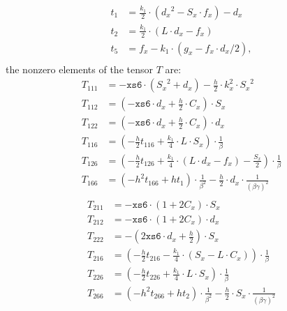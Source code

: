 \documentclass{cern-art} %
\begin{document}
\[
\begin{array}{rl}
     t_1 &= {\frac{k_1}{2}} {\cdot} \left({d_x}^2 - {S_x}{\cdot}{f_x}\right) - {d_x}\\
     t_2 &= {\frac{k_1}{2}} {\cdot} \left(L{\cdot}{d_x} - {f_x}\right)\\
     t_5 &= {f_x} - {k_1} {\cdot} \left({g_x} - {f_x}{\cdot}{d_x} / 2\right),\\
\end{array}
\]
the nonzero elements of the tensor $T$ are:
\[
\begin{array}{rl}
     T_{111} &= - \texttt{xs6} {\cdot} \left({S_x}^2 + {d_x}\right) - \frac{h}{2}{\cdot}{k_{x}^{2}}{\cdot}{S_x}^2\\
     T_{112} &= \left(- \texttt{xs6}{\cdot}{d_x} + \frac{h}{2}{\cdot}{C_x}\right) {\cdot} {S_x}\\
     T_{122} &= \left(- \texttt{xs6}{\cdot}{d_x} + \frac{h}{2}{\cdot}{C_x}\right) {\cdot} {d_x}\\
     T_{116} &= \left(- \frac{h}{2}t_{116} + {\frac{k_1}{4}}{\cdot}L{\cdot}{S_x}\right) {\cdot} {\frac 1 \beta}\\
     T_{126} &= \left(- \frac{h}{2}t_{126} + {\frac{k_1}{4}} {\cdot} \left(L{\cdot}{d_x} - {f_x}\right) - \frac{S_x}{2}\right) {\cdot} {\frac 1 \beta}\\
     T_{166} &= \left(- h^2  t_{166} + ht_1\right) {\cdot} {\frac 1{\beta^2}} - \frac{h}{2} {\cdot} {d_x} {\cdot} \frac 1 {{\left(\beta\gamma\right)}^2}\\
\end{array}
\]
\[
\begin{array}{rl}
     T_{211} &= - \texttt{xs6} {\cdot} \left(1 + 2 {C_x}\right) {\cdot} {S_x}\\
     T_{212} &= - \texttt{xs6} {\cdot} \left(1 + 2 {C_x}\right) {\cdot} {d_x}\\
     T_{222} &= - \left(2 \texttt{xs6}{\cdot}{d_x} + \frac{h}{2}\right) {\cdot} {S_x}\\
     T_{216} &= \left(- \frac{h}{2}t_{216} - {\frac{k_1}{4}} {\cdot} \left({S_x} - L{\cdot}{C_x}\right)\right) {\cdot} {\frac 1 \beta}\\
     T_{226} &= \left(- \frac{h}{2}t_{226} + {\frac{k_1}{4}} {\cdot} L {\cdot} {S_x}\right) {\cdot} {\frac 1 \beta}\\
     T_{266} &= \left(- h^2  t_{266} + ht_2\right) {\cdot} {\frac 1{\beta^2}} - \frac{h}{2} {\cdot} {S_x} {\cdot} \frac 1 {{\left(\beta\gamma\right)}^2}\\
\end{array}
\]
\end{document}

